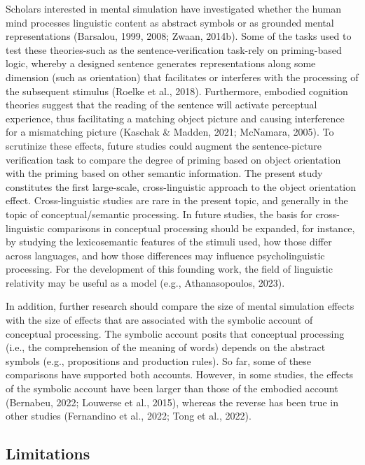\documentclass[
  man,floatsintext]{apa7}
\begin{document}
Scholars interested in mental simulation have investigated whether the
human mind processes linguistic content as abstract symbols or as
grounded mental representations (Barsalou, 1999, 2008; Zwaan, 2014b).
Some of the tasks used to test these theories-such as the
sentence-verification task-rely on priming-based logic, whereby a
designed sentence generates representations along some dimension (such
as orientation) that facilitates or interferes with the processing of
the subsequent stimulus (Roelke et al., 2018). Furthermore, embodied cognition
theories suggest that the reading of the sentence will activate
perceptual experience, thus facilitating a matching object picture and
causing interference for a mismatching picture
(Kaschak \& Madden, 2021; McNamara, 2005). To scrutinize these effects,
future studies could augment the sentence-picture verification task to
compare the degree of priming based on object orientation with the
priming based on other semantic information. The present study
constitutes the first large-scale, cross-linguistic approach to the
object orientation effect. Cross-linguistic studies are rare in the
present topic, and generally in the topic of conceptual/semantic
processing. In future studies, the basis for cross-linguistic
comparisons in conceptual processing should be expanded, for instance,
by studying the lexicosemantic features of the stimuli used, how those
differ across languages, and how those differences may influence
psycholinguistic processing. For the development of this founding work,
the field of linguistic relativity may be useful as a model (e.g., Athanasopoulos, 2023).

In addition, further research should compare the size of mental
simulation effects with the size of effects that are associated with the
symbolic account of conceptual processing. The symbolic account posits
that conceptual processing (i.e., the comprehension of the meaning of
words) depends on the abstract symbols (e.g., propositions and
production rules). So far, some of these comparisons have supported both
accounts. However, in some studies, the effects of the symbolic account
have been larger than those of the embodied account (Bernabeu, 2022; Louwerse et al., 2015), whereas the reverse has been true in other studies
(Fernandino et al., 2022; Tong et al., 2022).

\hypertarget{limitations}{%
\subsection{Limitations}\label{limitations}}
\end{document}
